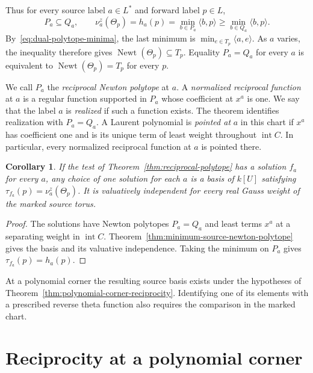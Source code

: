 \documentclass[11pt,reqno]{amsart}
\numberwithin{equation}{section}
\newtheorem{corollary}[theorem]{Corollary}
\theoremstyle{definition}
\theoremstyle{remark}
\DeclareMathOperator{\Newt}{Newt}
\begin{document}
Thus for every source label \(a\in L^*\) and forward label \(p\in L\),
\begin{equation}\label{eq:forward-newton-bound}
P_a\subseteq Q_a,\qquad \nu^z_a(\Theta_p)=h_a(p)=\min_{b\in P_a}\langle b,p\rangle\ge\min_{b\in Q_a}\langle b,p\rangle.
\end{equation}
By~\eqref{eq:dual-polytope-minima}, the last minimum is
\(\min_{e\in T_p}\langle a,e\rangle\). As \(a\) varies, the inequality
therefore gives \(\Newt(\Theta_p)\subseteq T_p\). Equality \(P_a=Q_a\)
for every \(a\) is equivalent to \(\Newt(\Theta_p)=T_p\) for every \(p\).

We call \(P_a\) the \emph{reciprocal Newton polytope} at \(a\).
A \emph{normalized reciprocal function} at \(a\) is a regular function
supported in \(P_a\) whose coefficient at \(x^a\) is one. We say
that the label \(a\) is \emph{realized} if such a function exists.
The theorem identifies realization with \(P_a=Q_a\).
A Laurent polynomial is \emph{pointed at} \(a\) in this chart if \(x^a\)
has coefficient one and is its unique term of least weight throughout
\(\operatorname{int}C\). In particular, every normalized reciprocal
function at \(a\) is pointed there.

\begin{corollary}\label{cor:reciprocal-from-windows}
If the test of Theorem~\ref{thm:reciprocal-polytope} has a solution
\(f_a\) for every \(a\), any choice of one solution for each \(a\)
is a basis of \(k[U]\) satisfying
\(\tau_{f_a}(p)=\nu^z_a(\Theta_p)\). It is valuatively independent
for every real Gauss weight of the marked source torus.
\end{corollary}
\begin{proof}
The solutions have Newton polytopes \(P_a=Q_a\) and least terms
\(x^a\) at a separating weight in \(\operatorname{int}C\).
Theorem~\ref{thm:minimum-source-newton-polytope} gives the basis and
its valuative independence. Taking the minimum on \(P_a\) gives
\(\tau_{f_a}(p)=h_a(p)\).
\end{proof}
At a polynomial corner the resulting source basis exists under the
hypotheses of Theorem~\ref{thm:polynomial-corner-reciprocity}.
Identifying one of its elements with a prescribed reverse theta
function also requires the comparison in the marked chart.

\section{Reciprocity at a polynomial corner}\label{sec:polynomial-corner-reciprocity}
\end{document}
